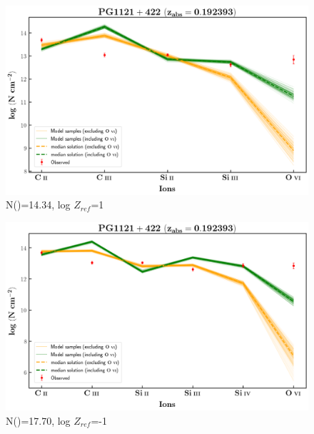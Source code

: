 \documentclass[12pt,draft]{report}
\newcommand\ion[2]{\text{#1\,\textsc{\lowercase{#2}}}}
\begin{document}
\begin{figure}[!b]
    \centering
    \includegraphics[width=0.85\linewidth]{Ionisation-Modelling-Plots/pg1121-z=0.192393-compI.png}
    \caption{N(\ion{H}{i})=14.34, log $Z_{ref}$=1}
\end{figure}

\begin{figure}[!t]
    \centering
    \includegraphics[width=0.85\linewidth]{Ionisation-Modelling-Plots/pg1121-z=0.192393-compII.png}
    \caption{N(\ion{H}{i})=17.70, log $Z_{ref}$=-1}
\end{figure}








\newpage
\end{document}
